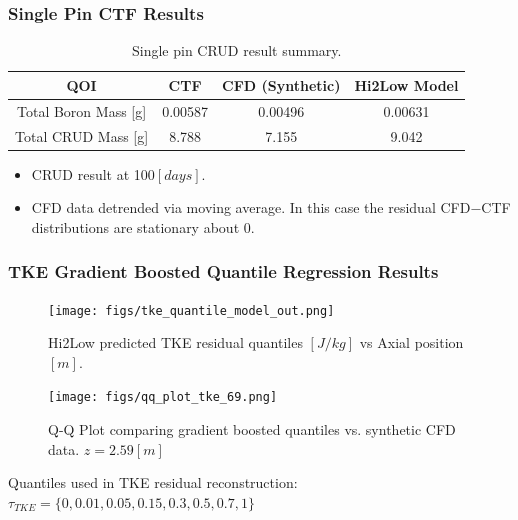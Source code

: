 \documentclass[t, pdftex]{beamer}
\begin{document}
\begin{frame}\frametitle{Single Pin CTF Results}
\begin{table}[h!]
\begin{center}
\begin{tabular}{|c|c|c|c|}
\hline 
 QOI  &   CTF	&  CFD (Synthetic)	& Hi2Low Model \\ \hline
Total Boron Mass [g]& 0.00587	&  0.00496	& 0.00631 \\
Total CRUD Mass [g]	& 8.788	&  7.155 & 9.042	\\
\hline
\end{tabular}
\caption{Single pin CRUD result summary.}
\label{tab:crud_res}
\end{center}
\end{table}
\begin{itemize}
\item CRUD result at 100$[days]$.  
\item CFD data detrended via moving average.  In this case the residual CFD$-$CTF distributions are stationary about 0.
\end{itemize}
\end{frame}

\begin{frame}\frametitle{TKE Gradient Boosted Quantile Regression Results}
    \begin{figure}
        \centering
        \begin{minipage}{.5\textwidth}
            \centering
            \texttt{[image: figs/tke\_quantile\_model\_out.png]}
            \caption{Hi2Low predicted TKE residual quantiles $[J/kg]$ vs Axial position $[m]$.}
        \end{minipage}%
        \begin{minipage}{.5\textwidth}
            \centering
            \texttt{[image: figs/qq\_plot\_tke\_69.png]}
            \caption{Q-Q Plot comparing gradient boosted quantiles vs. synthetic CFD data. $z=2.59[m]$}
        \end{minipage}
    \end{figure}
Quantiles used in TKE residual reconstruction: $\tau_{TKE}=\{0, 0.01, 0.05, 0.15, 0.3, 0.5, 0.7, 1\}$
\end{frame}
\end{document}
